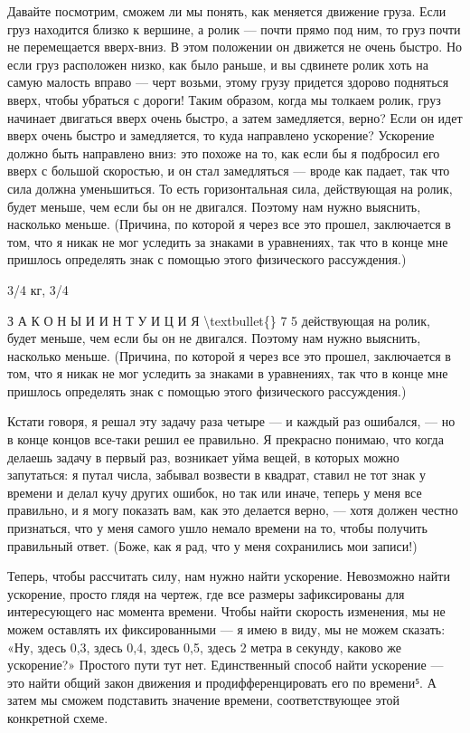 \documentclass[10pt,oneside]{article}
\begin{document}
Давайте посмотрим, сможем ли мы понять, как меняется движение груза. Если груз находится близко к вершине, а ролик --- почти прямо под ним, то груз почти не перемещается вверх-вниз. В этом положении он движется не очень быстро. Но если груз расположен низко, как было раньше, и вы сдвинете ролик хоть на самую малость вправо --- черт возьми, этому грузу придется здорово подняться вверх, чтобы убраться с дороги! Таким образом, когда мы толкаем ролик, груз начинает двигаться вверх очень быстро, а затем замедляется, верно? Если он идет вверх очень быстро и замедляется, то куда направлено ускорение? Ускорение должно быть направлено вниз: это похоже на то, как если бы я подбросил его вверх с большой скоростью, и он стал замедляться --- вроде как падает, так что сила должна уменьшиться. То есть горизонтальная сила, действующая на ролик, будет меньше, чем если бы он не двигался. Поэтому нам нужно выяснить, насколько меньше. (Причина, по которой я через все это прошел, заключается в том, что я никак не мог уследить за знаками в уравнениях, так что в конце мне пришлось определять знак с помощью этого физического рассуждения.)\par

3/4 кг, 3/4\par

З А К О Н Ы  И  И Н Т У И Ц И Я \textbackslash{}textbullet\{\} 7 5 действующая на ролик, будет меньше, чем если бы он не двигался. Поэтому нам нужно выяснить, насколько меньше. (Причина, по которой я через все это прошел, заключается в том, что я никак не мог уследить за знаками в уравнениях, так что в конце мне пришлось определять знак с помощью этого физического рассуждения.)\par

Кстати говоря, я решал эту задачу раза четыре --- и каждый раз ошибался, --- но в конце концов все-таки решил ее правильно. Я прекрасно понимаю, что когда делаешь задачу в первый раз, возникает уйма вещей, в которых можно запутаться: я путал числа, забывал возвести в квадрат, ставил не тот знак у времени и делал кучу других ошибок, но так или иначе, теперь у меня все правильно, и я могу показать вам, как это делается верно, --- хотя должен честно признаться, что у меня самого ушло немало времени на то, чтобы получить правильный ответ. (Боже, как я рад, что у меня сохранились мои записи!)\par

Теперь, чтобы рассчитать силу, нам нужно найти ускорение. Невозможно найти ускорение, просто глядя на чертеж, где все размеры зафиксированы для интересующего нас момента времени. Чтобы найти скорость изменения, мы не можем оставлять их фиксированными --- я имею в виду, мы не можем сказать: «Ну, здесь 0,3, здесь 0,4, здесь 0,5, здесь 2 метра в секунду, каково же ускорение?» Простого пути тут нет. Единственный способ найти ускорение --- это найти общий закон движения и продифференцировать его по времени⁵. А затем мы сможем подставить значение времени, соответствующее этой конкретной схеме.\par
\end{document}
